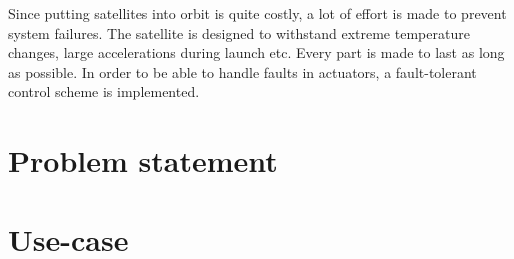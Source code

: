  Since putting satellites into orbit is quite costly, a lot of effort is made to prevent system failures. The satellite is designed to withstand extreme temperature changes, large accelerations during launch etc. Every part is made to last as long as possible. In order to be able to handle faults in actuators, a fault-tolerant control scheme is implemented.
 
 
 
 
 

\section{Problem statement}


\section{Use-case}\label{sec:useCase}


